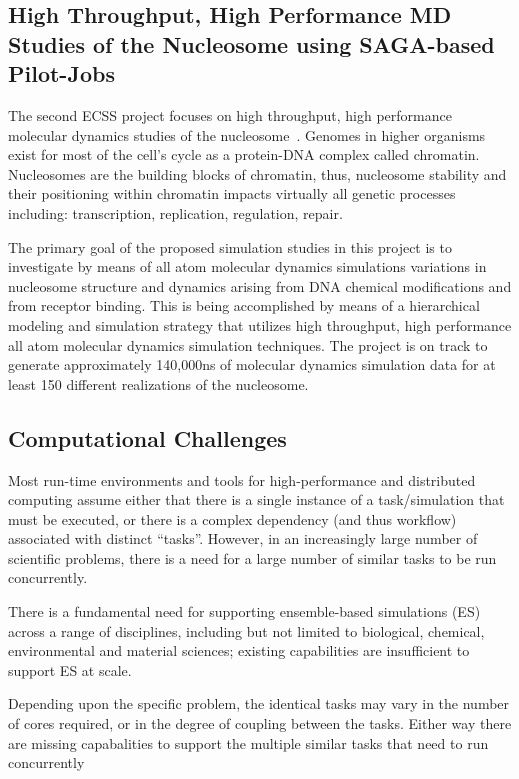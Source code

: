 \documentclass{sig-alternate}
\begin{document}
\subsection{High Throughput, High Performance MD Studies of the Nucleosome
using SAGA-based Pilot-Jobs}
The second ECSS project focuses on high throughput, high performance molecular
dynamics studies of the nucleosome~\cite{TomBishop}. Genomes in higher organisms
exist for most of the cell's cycle as a protein-DNA complex called chromatin.
Nucleosomes are the building blocks of chromatin, thus, nucleosome stability and
their positioning within chromatin impacts virtually all genetic processes
including: transcription, replication, regulation, repair.

The primary goal of the proposed simulation studies in this project is to
investigate by means of all atom molecular dynamics simulations variations in
nucleosome structure and dynamics arising from DNA chemical modifications and
from receptor binding. This is being accomplished by means of a hierarchical
modeling and simulation strategy that utilizes high throughput, high
performance all atom molecular dynamics simulation techniques. The project is
on track to generate approximately 140,000ns of molecular dynamics simulation
data for at least 150 different realizations of the nucleosome.


\subsection{Computational Challenges}

Most run-time environments and tools for high-performance and
distributed computing assume either that there is a single instance of
a task/simulation that must be executed, or there is a complex
dependency (and thus workflow) associated with distinct ``tasks''.
However, in an increasingly large number of scientific problems, there
is a need for a large number of similar tasks to be run concurrently.

There is a fundamental need for supporting ensemble-based simulations
(ES) across a range of disciplines, including but not limited to
biological, chemical, environmental and material sciences; existing
capabilities are insufficient to support ES at scale. 

Depending upon the specific problem, the identical tasks may vary in
the number of cores required, or in the degree of coupling between the
tasks.  Either way there are missing capabalities to support the
multiple similar tasks that need to run concurrently
\end{document}
